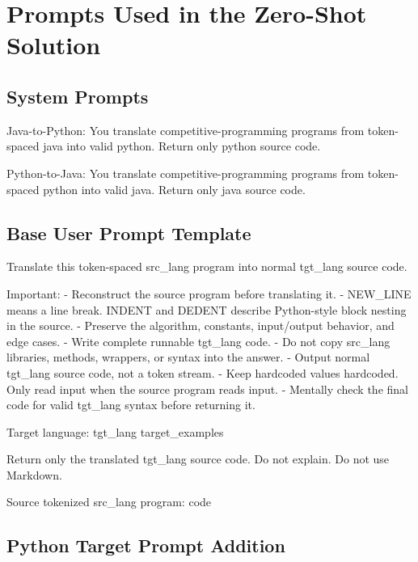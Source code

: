 \chapter{Prompts Used in the Zero-Shot Solution}
\label{appendix:zero-shot-prompts}

\section{System Prompts}

\begin{promptbox}
Java-to-Python:
You translate competitive-programming programs from token-spaced java into valid python. Return only python source code.

Python-to-Java:
You translate competitive-programming programs from token-spaced python into valid java. Return only java source code.
\end{promptbox}

\section{Base User Prompt Template}

\begin{promptbox}
Translate this token-spaced {src_lang} program into normal {tgt_lang} source code.

Important:
- Reconstruct the source program before translating it.
- NEW_LINE means a line break. INDENT and DEDENT describe Python-style block nesting in the source.
- Preserve the algorithm, constants, input/output behavior, and edge cases.
- Write complete runnable {tgt_lang} code.
- Do not copy {src_lang} libraries, methods, wrappers, or syntax into the answer.
- Output normal {tgt_lang} source code, not a token stream.
- Keep hardcoded values hardcoded. Only read input when the source program reads input.
- Mentally check the final code for valid {tgt_lang} syntax before returning it.

Target language: {tgt_lang}
{target_examples}

Return only the translated {tgt_lang} source code. Do not explain. Do not use Markdown.

Source tokenized {src_lang} program:
{code}
\end{promptbox}

\section{Python Target Prompt Addition}

